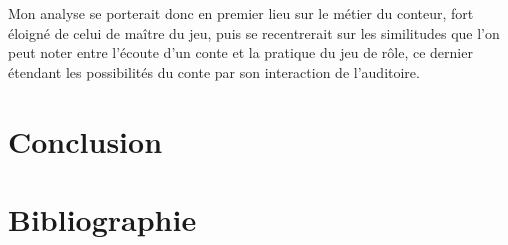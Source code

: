 \documentclass[a4paper,12pt,final,oneside]{article}
\begin{document}
Mon analyse se porterait donc en premier lieu sur le métier du conteur, fort éloigné de celui de maître du jeu, puis se recentrerait sur les similitudes que l'on peut noter entre l'écoute d'un conte et la pratique du jeu de rôle, ce dernier étendant les possibilités du conte par son interaction de l'auditoire.
\clearpage


\section{Conclusion}
\clearpage

\section{Bibliographie}
\def\section*#1{} %


\end{document}
